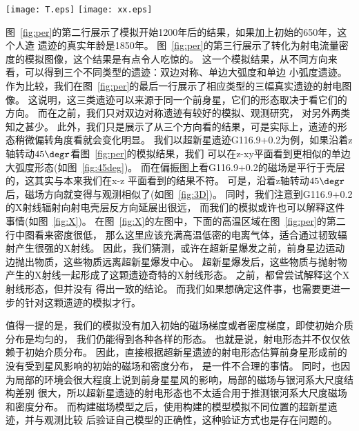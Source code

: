 \begin{figure*}
    \centering
    \texttt{[image: T.eps]}
    \texttt{[image: xx.eps]}
    \caption{\textit{左图:}x-z平面的相对温度分布。\textit{右图:} ASCA (Advanced Satellite for
    Cosmology and Astrophysics)望远镜观测到的G116.9+0.2的X图像G116.9+0.2，外加CGPS
     (Canadian Galactic Plane Survey)巡天的射电图像等高线\citep{Pannuti2010}。}
\label{fig:X}
\end{figure*}

图~\ref{fig:per}的第二行展示了模拟开始1200年后的结果，如果加上初始的650年，这个人造
遗迹的真实年龄是1850年。
图~\ref{fig:per}的第三行展示了转化为射电流量密度的模拟图像，这个结果是有点令人吃惊的。
这一个模拟结果，从不同方向来看，可以得到三个不同类型的遗迹：双边对称、单边大弧度和单边
小弧度遗迹。
作为比较，我们在图~\ref{fig:per}的最后一行展示了相应类型的三幅真实遗迹的射电图像。
这说明，这三类遗迹可以来源于同一个前身星，它们的形态取决于看它们的方向。
而在之前，我们只对双边对称遗迹有较好的模拟、观测研究\citep{Gaensler1999,Petruk2009a}，
对另外两类知之甚少。
此外，我们只是展示了从三个方向看的结果，可是实际上，遗迹的形态稍微偏转角度看就会变化明显。
我们以超新星遗迹G116.9+0.2为例，如果沿着z轴转动$45\degr$看图~\ref{fig:per}的模拟结果，我们
可以在z-xy平面看到更相似的单边大弧度形态(如图~\ref{fig:45deg})。
而在偏振图上看G116.9+0.2的磁场是平行于壳层的\citep{Sun2011}，这其实与本来我们在x-z
平面看到的结果不符。
可是，沿着z轴转动$45\degr$后，磁场方向就变得与观测相似了(如图~\ref{fig:3D})。
同时，我们注意到G116.9+0.2的X射线辐射向射电壳层反方向延展出很远\citep{Pannuti2010}，
而我们的模拟或许也可以解释这件事情(如图~\ref{fig:X})。
在图~\ref{fig:X}的左图中，下面的高温区域在图~\ref{fig:per}的第二行中图看来密度很低，
那么这里应该充满高温低密的电离气体，适合通过韧致辐射产生很强的X射线。
因此，我们猜测，或许在超新星爆发之前，前身星边运动边抛出物质，这些物质远离超新星爆发中心。
超新星爆发后，这些物质与抛射物产生的X射线一起形成了这颗遗迹奇特的X射线形态。
之前，\citet{Craig1997,Yar-Uyaniker2004,West2016}都曾尝试解释这个X射线形态，但并没有
得出一致的结论。
而我们如果想确定这件事，也需要更进一步的针对这颗遗迹的模拟才行。

值得一提的是，我们的模拟没有加入初始的磁场梯度或者密度梯度，即使初始介质分布是均匀的，
我们仍能得到各种各样的形态。
也就是说，射电形态并不仅仅依赖于初始介质分布。
因此，直接根据超新星遗迹的射电形态估算前身星形成前的没有受到星风影响的初始的磁场和密度分布，
是一件不合理的事情。
同时，也因为局部的环境会很大程度上说到前身星星风的影响，局部的磁场与银河系大尺度结构差别
很大，所以超新星遗迹的射电形态也不太适合用于推测银河系大尺度磁场和密度分布。
而\citet{West2016}构建磁场模型之后，使用构建的模型模拟不同位置的超新星遗迹，并与观测比较
后验证自己模型的正确性，这种验证方式也是存在问题的。

